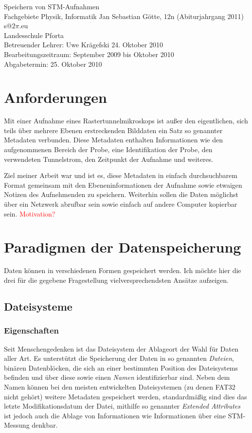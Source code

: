 \documentclass[12pt,ngerman,a4]{scrartcl}
\newcommand{\annot}[1]{{\textcolor{red}{#1}}}%
\begin{document}

\vspace*{3cm}
Speichern von STM-Aufnahmen\\
\vspace*{1cm}
\large Fachgebiete Physik, Informatik
Jan Sebastian Götte, 12n (Abiturjahrgang 2011)\\
s@$2\pi$.eu\\
Landesschule Pforta\\
Betreuender Lehrer: Uwe Krägefski
24. Oktober 2010\\
Bearbeitungszeitraum: September 2009 bis Oktober 2010\\
Abgabetermin: 25. Oktober 2010

\thispagestyle{empty}
\newpage
\tableofcontents
\pagestyle{scrheadings}
\newpage
\section{Anforderungen}
Mit einer Aufnahme eines Rastertunnelmikroskops ist außer den eigentlichen, sich teils über mehrere Ebenen erstreckenden Bilddaten ein Satz so genannter Metadaten verbunden. Diese Metadaten enthalten Informationen wie den aufgenommenen Bereich der Probe, eine Identifikation der Probe, den verwendeten Tunnelstrom, den Zeitpunkt der Aufnahme und weiteres.

Ziel meiner Arbeit war und ist es, diese Metadaten in einfach durchsuchbarem Format gemeinsam mit den Ebeneninformationen der Aufnahme sowie etwaigen Notizen des Aufnehmenden zu speichern. Weiterhin sollen die Daten möglichst über ein Netzwerk abrufbar sein sowie einfach auf andere Computer kopierbar sein.
\annot{Motivation?}

\section{Paradigmen der Datenspeicherung}
Daten können in verschiedenen Formen gespeichert werden. Ich möchte hier die drei für die gegebene Fragestellung vielversprechendsten Ansätze aufzeigen.
\subsection{Dateisysteme}
\subsubsection{Eigenschaften}
Seit Menschengedenken ist das Dateisystem der Ablageort der Wahl für Daten aller Art. Es unterstützt die Speicherung der Daten in so genannten \emph{Dateien}, binären Datenblöcken, die sich an einer bestimmten Position des Dateisystems befinden und über diese sowie einen \emph{Namen} identifizierbar sind. Neben dem Namen können bei den meisten entwickelten Dateisystemen (zu denen FAT32 nicht gehört) weitere Metadaten gespeichert werden, standardmäßig sind dies das letzte Modifikationsdatum der Datei, mithilfe so genannter \emph{Extended Attributes} ist jedoch auch die Ablage von Informationen wie Informationen über eine STM-Messung denkbar.
\end{document}
